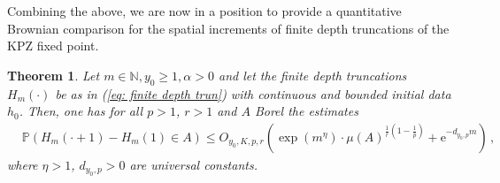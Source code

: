 \documentclass[11pt, reqno]{amsart}
\numberwithin{equation}{section}
\newcounter{dummy} \numberwithin{dummy}{section}
\newtheorem{theorem}[dummy]{Theorem}
\newcommand{\N}{\ensuremath{\mathbb{N}}}
\newcommand{\PP}{\ensuremath{\mathbb{P}}}
\begin{document}
\color{black}
Combining the above, we are now in a position to provide a quantitative Brownian comparison for the spatial increments of finite depth truncations of the KPZ fixed point.

\begin{theorem}\label{thm: finite depth KPZ bounds}
    Let $m\in \N, y_0 \ge 1, \alpha > 0$ and let the finite depth truncations $H_m(\cdot)$ be as in (\ref{eq: finite depth trun}) with continuous and bounded initial data $h_0$. Then, one has for all $p>1$, $r>1$ and $A$ Borel the estimates
\begin{equation*}
    \begin{array}{cc}
        &\PP \left( H_m(\cdot + 1)-H_m(1)\in A \right)\le O_{y_0, K, p,r}\left(\exp(m^\eta)\cdot \mu(A)^{\frac{1}{r}(1-\frac{1}{p})}+ \mathrm{e}^{-d_{y_0, p} m}\right)\,,
    \end{array}
\end{equation*}
where $\eta > 1$, $d_{y_0, p}>0$ are universal constants.
\end{theorem}
\end{document}
